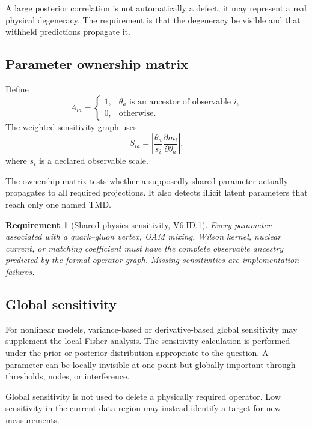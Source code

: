 \documentclass[11pt]{article}
\newtheorem{requirement}[definition]{Requirement}
\begin{document}
A large posterior correlation is not automatically a defect; it may represent
a real physical degeneracy.  The requirement is that the degeneracy be visible
and that withheld predictions propagate it.

\subsection{Parameter ownership matrix}

Define
\begin{equation}
 A_{ia}
 =
 \begin{cases}
 1,& \theta_a\text{ is an ancestor of observable }i,\\
 0,& \text{otherwise}.
 \end{cases}
 \label{eq:ownership-matrix}
\end{equation}
The weighted sensitivity graph uses
\begin{equation}
 S_{ia}
 =
 \left|
 \frac{\theta_a}{s_i}
 \frac{\partial m_i}{\partial\theta_a}
 \right|,
 \label{eq:dimensionless-sensitivity}
\end{equation}
where \(s_i\) is a declared observable scale.

The ownership matrix tests whether a supposedly shared parameter actually
propagates to all required projections.  It also detects illicit latent
parameters that reach only one named TMD.

\begin{requirement}[Shared-physics sensitivity, V6.ID.1]
Every parameter associated with a quark--gluon vertex, OAM mixing, Wilson
kernel, nuclear current, or matching coefficient must have the complete
observable ancestry predicted by the formal operator graph.  Missing
sensitivities are implementation failures.
\end{requirement}

\subsection{Global sensitivity}

For nonlinear models, variance-based or derivative-based global sensitivity
may supplement the local Fisher analysis.  The sensitivity calculation is
performed under the prior or posterior distribution appropriate to the
question.  A parameter can be locally invisible at one point but globally
important through thresholds, nodes, or interference.

Global sensitivity is not used to delete a physically required operator.
Low sensitivity in the current data region may instead identify a target for
new measurements.
\end{document}
